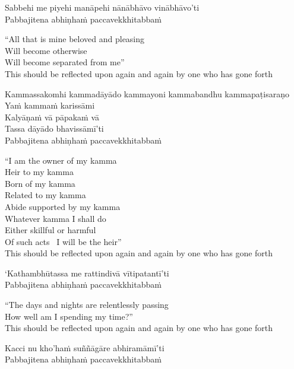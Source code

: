 Sabbehi me piyehi manāpehi nānābhāvo vinābhāvo'ti\\
Pabbajitena abhiṇhaṁ paccavekkhitabbaṁ

\begin{english}
  “All that is mine beloved and pleasing\\
  Will become otherwise\\
  Will become separated from me”\\
  This should be reflected upon again and again by one who has gone forth
\end{english}

Kammassakomhi kammadāyādo kammayoni kammabandhu kammapaṭisaraṇo\\
Yaṁ kammaṁ karissāmi\\
Kalyāṇaṁ vā pāpakaṁ vā\\
Tassa dāyādo bhavissāmī'ti\\
Pabbajitena abhiṇhaṁ paccavekkhitabbaṁ

\begin{english}
  “I am the owner of my kamma\\
  Heir to my kamma\\
  Born of my kamma\\
  Related to my kamma\\
  Abide supported by my kamma\\
  Whatever kamma I shall do\\
  Either skillful or harmful\\
  Of such acts \breathmark\ I will be the heir”\\
  This should be reflected upon again and again by one who has gone forth
\end{english}

`Kathambhūtassa me rattindivā vītipatantī'ti\\
Pabbajitena abhiṇhaṁ paccavekkhitabbaṁ

\begin{english}
  “The days and nights are relentlessly passing\\
  How well am I spending my time?”\\
  This should be reflected upon again and again by one who has gone forth
\end{english}

Kacci nu kho'haṁ suññāgāre abhiramāmī'ti\\
Pabbajitena abhiṇhaṁ paccavekkhitabbaṁ

